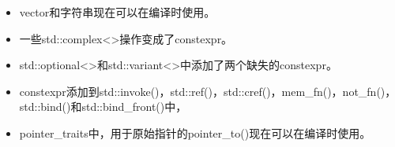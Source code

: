 \begin{itemize}
\item
vector和字符串现在可以在编译时使用。

\item
一些std::complex<>操作变成了constexpr。

\item
std::optional<>和std::variant<>中添加了两个缺失的constexpr。

\item
constexpr添加到std::invoke()，std::ref()，std::cref()，mem\_fn()，not\_fn()，std::bind()和std::bind\_front()中，

\item
pointer\_traits中，用于原始指针的pointer\_to()现在可以在编译时使用。
\end{itemize}
















